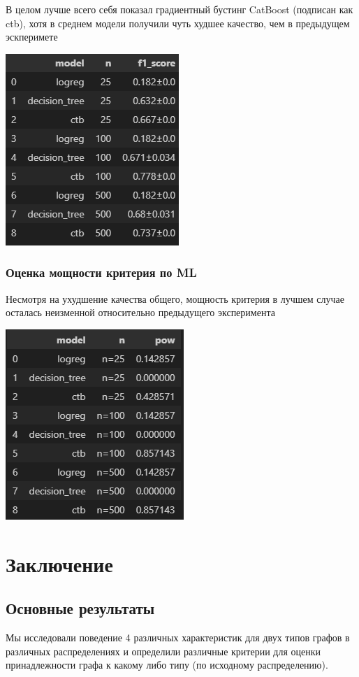 \documentclass[a4paper,12pt]{report}
\begin{document}
В целом лучше всего себя показал градиентный бустинг CatBoost (подписан как ctb), хотя в среднем модели получили чуть худшее качество, чем в предыдущем эскперимете

\includegraphics[width=0.5\linewidth]{images/kuleshov_part4.png}

\subsection{Оценка мощности критерия по ML}

Несмотря на ухудшение качества общего, мощность критерия в лучшем случае осталась неизменной относительно предыдущего эксперимента

\includegraphics[width=0.5\linewidth]{images/kuleshov_part5.png}


\chapter*{Заключение}

\section*{Основные результаты}
Мы исследовали поведение 4 различных характеристик для двух типов графов в различных распределениях и определили различные критерии для оценки принадлежности графа к какому либо типу (по исходному распределению). 
\end{document}
